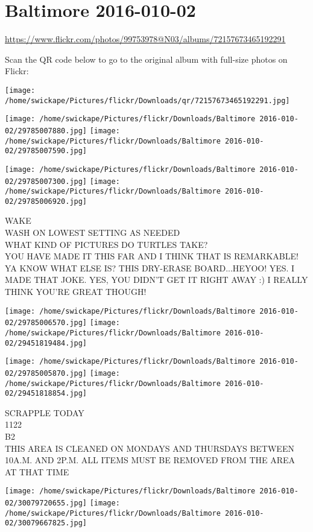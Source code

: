 \documentclass[10pt,letterpaper]{article}
\title{}
\author{}
\date{}
\begin{document}
\section*{Baltimore 2016-010-02}

\url{https://www.flickr.com/photos/99753978@N03/albums/72157673465192291}

Scan the QR code below to go to the original album with full-size photos on Flickr:

\texttt{[image: /home/swickape/Pictures/flickr/Downloads/qr/72157673465192291.jpg]}
\pagebreak

\texttt{[image: /home/swickape/Pictures/flickr/Downloads/Baltimore 2016-010-02/29785007880.jpg]}
\texttt{[image: /home/swickape/Pictures/flickr/Downloads/Baltimore 2016-010-02/29785007590.jpg]}

\texttt{[image: /home/swickape/Pictures/flickr/Downloads/Baltimore 2016-010-02/29785007300.jpg]}
\texttt{[image: /home/swickape/Pictures/flickr/Downloads/Baltimore 2016-010-02/29785006920.jpg]}

WAKE\\
WASH ON LOWEST SETTING AS NEEDED\\
WHAT KIND OF PICTURES DO TURTLES TAKE?\\
YOU HAVE MADE IT THIS FAR AND I THINK THAT IS REMARKABLE!  YA KNOW WHAT ELSE IS?  THIS DRY{-}ERASE BOARD...HEYOO! YES.  I MADE THAT JOKE.  YES, YOU DIDN'T GET IT RIGHT AWAY :) I REALLY THINK YOU'RE GREAT THOUGH!
\pagebreak

\texttt{[image: /home/swickape/Pictures/flickr/Downloads/Baltimore 2016-010-02/29785006570.jpg]}
\texttt{[image: /home/swickape/Pictures/flickr/Downloads/Baltimore 2016-010-02/29451819484.jpg]}

\texttt{[image: /home/swickape/Pictures/flickr/Downloads/Baltimore 2016-010-02/29785005870.jpg]}
\texttt{[image: /home/swickape/Pictures/flickr/Downloads/Baltimore 2016-010-02/29451818854.jpg]}

SCRAPPLE TODAY\\
1122\\
B2\\
THIS AREA IS CLEANED ON MONDAYS AND THURSDAYS BETWEEN 10A.M. AND 2P.M. ALL ITEMS MUST BE REMOVED FROM THE AREA AT THAT TIME
\pagebreak

\texttt{[image: /home/swickape/Pictures/flickr/Downloads/Baltimore 2016-010-02/30079720655.jpg]}
\texttt{[image: /home/swickape/Pictures/flickr/Downloads/Baltimore 2016-010-02/30079667825.jpg]}
\end{document}
